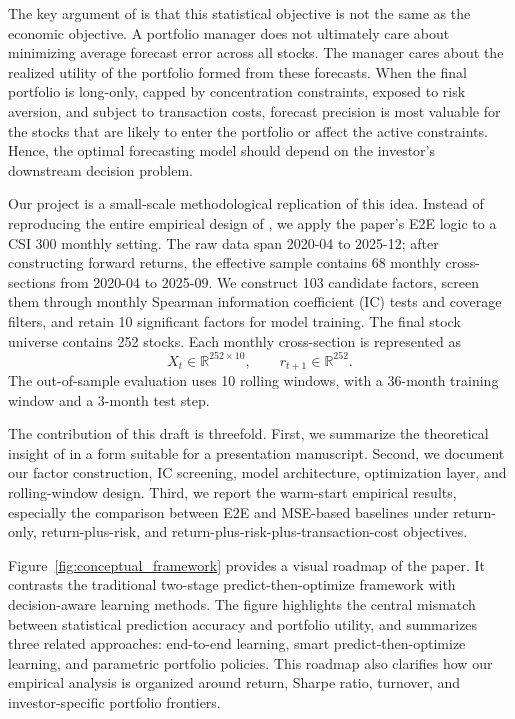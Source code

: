 \documentclass[11pt]{article}
\begin{document}
The key argument of \citet{wang2026mlmm} is that this statistical objective is not the same as the economic objective. A portfolio manager does not ultimately care about minimizing average forecast error across all stocks. The manager cares about the realized utility of the portfolio formed from these forecasts. When the final portfolio is long-only, capped by concentration constraints, exposed to risk aversion, and subject to transaction costs, forecast precision is most valuable for the stocks that are likely to enter the portfolio or affect the active constraints. Hence, the optimal forecasting model should depend on the investor's downstream decision problem.

Our project is a small-scale methodological replication of this idea. Instead of reproducing the entire empirical design of \citet{wang2026mlmm}, we apply the paper's E2E logic to a CSI 300 monthly setting. The raw data span 2020-04 to 2025-12; after constructing forward returns, the effective sample contains 68 monthly cross-sections from 2020-04 to 2025-09. We construct 103 candidate factors, screen them through monthly Spearman information coefficient (IC) tests and coverage filters, and retain 10 significant factors for model training. The final stock universe contains 252 stocks. Each monthly cross-section is represented as
\[
    X_t \in \mathbb{R}^{252 \times 10}, \qquad r_{t+1}\in \mathbb{R}^{252}.
\]
The out-of-sample evaluation uses 10 rolling windows, with a 36-month training window and a 3-month test step.

The contribution of this draft is threefold. First, we summarize the theoretical insight of \citet{wang2026mlmm} in a form suitable for a presentation manuscript. Second, we document our factor construction, IC screening, model architecture, optimization layer, and rolling-window design. Third, we report the warm-start empirical results, especially the comparison between E2E and MSE-based baselines under return-only, return-plus-risk, and return-plus-risk-plus-transaction-cost objectives.

Figure~\ref{fig:conceptual_framework} provides a visual roadmap of the paper. 
It contrasts the traditional two-stage predict-then-optimize framework with decision-aware learning methods. 
The figure highlights the central mismatch between statistical prediction accuracy and portfolio utility, and summarizes three related approaches: end-to-end learning, smart predict-then-optimize learning, and parametric portfolio policies. 
This roadmap also clarifies how our empirical analysis is organized around return, Sharpe ratio, turnover, and investor-specific portfolio frontiers.
\end{document}
